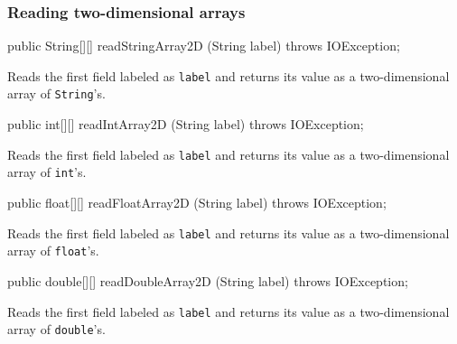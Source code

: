 \subsubsection*{Reading two-dimensional arrays}
\begin{code}

   public String[][] readStringArray2D (String label) throws IOException;
\end{code}
\begin{tabb}
Reads the first field labeled as \texttt{label} and returns its value as a two-dimensional array of \texttt{String}'s.
\end{tabb}
\begin{code}

   public int[][] readIntArray2D (String label) throws IOException;
\end{code}
\begin{tabb}
Reads the first field labeled as \texttt{label} and returns its value as a two-dimensional array of \texttt{int}'s.
\end{tabb}
\begin{code}

   public float[][] readFloatArray2D (String label) throws IOException;
\end{code}
\begin{tabb}
Reads the first field labeled as \texttt{label} and returns its value as a two-dimensional array of \texttt{float}'s.
\end{tabb}
\begin{code}

   public double[][] readDoubleArray2D (String label) throws IOException;
\end{code}
\begin{tabb}
Reads the first field labeled as \texttt{label} and returns its value as a two-dimensional array of \texttt{double}'s.
\end{tabb}


